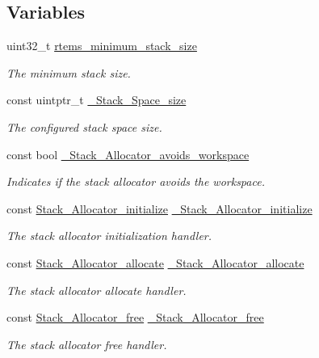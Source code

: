 \subsection*{Variables}
\begin{DoxyCompactItemize}
\item 
uint32\+\_\+t \mbox{\hyperlink{group__RTEMSScoreStack_gae18af1b30b702cd1f139f7df0d54acf4}{rtems\+\_\+minimum\+\_\+stack\+\_\+size}}
\begin{DoxyCompactList}\small\item\em The minimum stack size. \end{DoxyCompactList}\item 
const uintptr\+\_\+t \mbox{\hyperlink{group__RTEMSScoreStack_ga8c5d8c7c95443b50e9503b2d91db5ae9}{\+\_\+\+Stack\+\_\+\+Space\+\_\+size}}
\begin{DoxyCompactList}\small\item\em The configured stack space size. \end{DoxyCompactList}\item 
const bool \mbox{\hyperlink{group__RTEMSScoreStack_ga3ad1e88117c7fed8908bfe98c6da30c3}{\+\_\+\+Stack\+\_\+\+Allocator\+\_\+avoids\+\_\+workspace}}
\begin{DoxyCompactList}\small\item\em Indicates if the stack allocator avoids the workspace. \end{DoxyCompactList}\item 
const \mbox{\hyperlink{group__RTEMSScoreStack_ga0b4e6be94e46e4f0a9e862e1f818d28b}{Stack\+\_\+\+Allocator\+\_\+initialize}} \mbox{\hyperlink{group__RTEMSScoreStack_gac8c437cd523908b2f03d1015af97dce0}{\+\_\+\+Stack\+\_\+\+Allocator\+\_\+initialize}}
\begin{DoxyCompactList}\small\item\em The stack allocator initialization handler. \end{DoxyCompactList}\item 
const \mbox{\hyperlink{group__RTEMSScoreStack_ga1e4edf42aa30aeab80fefb866e892a3d}{Stack\+\_\+\+Allocator\+\_\+allocate}} \mbox{\hyperlink{group__RTEMSScoreStack_ga990e004f5df8e25208220ffb1efcf7f6}{\+\_\+\+Stack\+\_\+\+Allocator\+\_\+allocate}}
\begin{DoxyCompactList}\small\item\em The stack allocator allocate handler. \end{DoxyCompactList}\item 
const \mbox{\hyperlink{group__RTEMSScoreStack_ga2bc90d7062b3eba257c6e2e3836deb8b}{Stack\+\_\+\+Allocator\+\_\+free}} \mbox{\hyperlink{group__RTEMSScoreStack_gac6757ab9b463b2ac5c47a7e43e6da309}{\+\_\+\+Stack\+\_\+\+Allocator\+\_\+free}}
\begin{DoxyCompactList}\small\item\em The stack allocator free handler. \end{DoxyCompactList}\end{DoxyCompactItemize}



